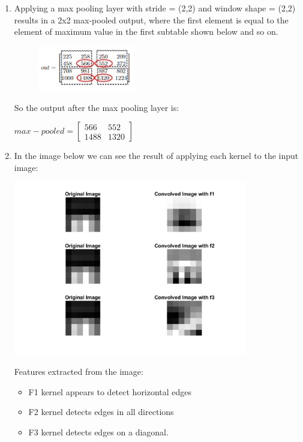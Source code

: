 \documentclass{article}
\begin{document}
\begin{enumerate} [label=\Alph*]
    
    \item  Applying a max pooling layer with stride = (2,2) and window shape = (2,2) results in a 2x2 max-pooled output, where the first element is equal to the element of maximum value in the first subtable shown below and so on. 
        \begin{figure}[h]
          \centering
          \includegraphics[width=0.4\textwidth]{prob11_b.png} \\      
        \end{figure}
        \newline So the output after the max pooling layer is:
        \begin{center}
        $ max-pooled = \begin{bmatrix}
            566 & 552 \\
            1488 & 1320
        \end{bmatrix}$ 
        \end{center}
    
    \item In the image below we can see the result of applying each kernel to the input image: \\
        \begin{center}
            \includegraphics[width=0.8\textwidth]{problem11images.png}
        \end{center}
        Features extracted from the image:
        \begin{itemize}
          \item F1 kernel appears to detect horizontal edges
          \item F2 kernel detects edges in all directions
          \item F3 kernel detects edges on a diagonal.
        \end{itemize}
        
        
            
\end{enumerate}\
\end{document}
